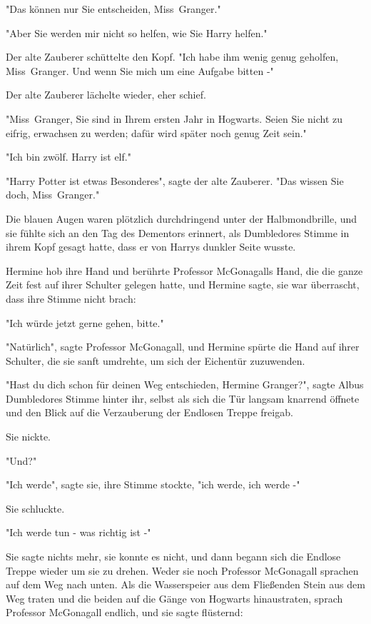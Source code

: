{"Das können nur Sie entscheiden, Miss~Granger."

"Aber Sie werden mir nicht so helfen, wie Sie Harry helfen."

Der alte Zauberer schüttelte den Kopf. "Ich habe ihm wenig genug geholfen, Miss~Granger. Und wenn Sie mich um eine Aufgabe bitten -"

Der alte Zauberer lächelte wieder, eher schief.

"Miss~Granger, Sie sind in Ihrem ersten Jahr in Hogwarts. Seien Sie nicht zu eifrig, erwachsen zu werden; dafür wird später noch genug Zeit sein."

"Ich bin zwölf. Harry ist elf."

"Harry Potter ist etwas Besonderes", sagte der alte Zauberer. "Das wissen Sie doch, Miss~Granger."

Die blauen Augen waren plötzlich durchdringend unter der Halbmondbrille, und sie fühlte sich an den Tag des Dementors erinnert, als Dumbledores Stimme in ihrem Kopf gesagt hatte, dass er von Harrys dunkler Seite wusste.

Hermine hob ihre Hand und berührte Professor McGonagalls Hand, die die ganze Zeit fest auf ihrer Schulter gelegen hatte, und Hermine sagte, sie war überrascht, dass ihre Stimme nicht brach:

"Ich würde jetzt gerne gehen, bitte."

"Natürlich", sagte Professor McGonagall, und Hermine spürte die Hand auf ihrer Schulter, die sie sanft umdrehte, um sich der Eichentür zuzuwenden.

"Hast du dich schon für deinen Weg entschieden, Hermine Granger?", sagte Albus Dumbledores Stimme hinter ihr, selbst als sich die Tür langsam knarrend öffnete und den Blick auf die Verzauberung der Endlosen Treppe freigab.

Sie nickte.

"Und?"

"Ich werde", sagte sie, ihre Stimme stockte, "ich werde, ich werde -"

Sie schluckte.

"Ich werde tun - was richtig ist -"

Sie sagte nichts mehr, sie konnte es nicht, und dann begann sich die Endlose Treppe wieder um sie zu drehen. Weder sie noch Professor McGonagall sprachen auf dem Weg nach unten. Als die Wasserspeier aus dem Fließenden Stein aus dem Weg traten und die beiden auf die Gänge von Hogwarts hinaustraten, sprach Professor McGonagall endlich, und sie sagte flüsternd:

}
